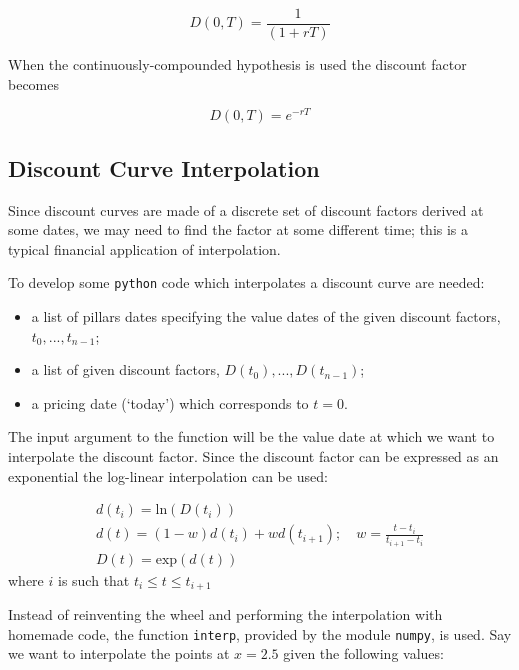 \begin{equation}
D(0, T)= \frac {1}{(1+rT)}
\label{eq:discount_factor}
\end{equation}

When the continuously-compounded hypothesis is used the discount factor becomes

\begin{equation}
D(0, T)= e^{-rT}
\label{eq:discount_factor_cc}
\end{equation}

\subsection{Discount Curve Interpolation}
\label{discount-curve-interpolation}

Since discount curves are made of a discrete set of discount factors derived at some dates, we may need to find the factor at some different time; this is a typical financial application of interpolation.

To develop some \texttt{python} code which interpolates a discount curve are needed:

\begin{itemize}
\tightlist
\item a list of pillars dates specifying the value dates of the given discount factors, \(t_0,...,t_{n-1}\);
\item a list of given discount factors, \(D(t_0),...,D(t_{n-1})\);
\item a pricing date (`today') which corresponds to \(t=0\).
\end{itemize}

The input argument to the function will be the value date at which we want to interpolate the discount factor. Since the discount factor can be expressed as an exponential the log-linear interpolation can be used:

\begin{equation}
\begin{gathered}
d(t_i)=\mathrm{ln}(D(t_i))\\
d(t) = (1-w)d(t_i) + wd(t_{i+1});\quad w=\frac{t-t_i}{t_{i+1}-t_i}\\
D(t) = \mathrm{exp}(d(t))
\end{gathered}
\end{equation}
where \(i\) is such that \(t_i \le t \le t_{i+1}\)

Instead of reinventing the wheel and performing the interpolation with homemade code, 
the function \texttt{interp}, provided by the module \texttt{numpy}, is used. 
Say we want to interpolate the points at $x = 2.5$ given the following values:

